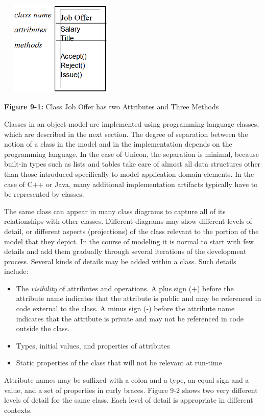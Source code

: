 \includegraphics[width=2.3in,height=1.8in]{ub-img/umlclass.png} 

{\sffamily\bfseries Figure 9-1:}
{\sffamily Class Job Offer has two Attributes and Three Methods}

\bigskip

Classes in an object model are
implemented using programming language classes, which are described in
the next section. The degree of separation between the notion of a
class in the model and in the implementation depends on the programming
language. In the case of Unicon, the separation is minimal, because
built-in types such as lists and tables take care of almost all data
structures other than those introduced specifically to model
application domain elements. In the case of C++ or Java,
many additional implementation artifacts typically have to be
represented by classes.

The same class can appear in many class diagrams to capture all of its
relationships with other classes. Different diagrams may show different
levels of detail, or different aspects (projections) of the class
relevant to the portion of the model that they depict. In the course of
modeling it is normal to start with few details and add them gradually
through several iterations of the development process. Several kinds of
details may be added within a class. Such details include:

\begin{itemize}
\item The \textit{visibility} of
attributes and operations. A plus sign (+) before the attribute name
indicates that the attribute is public and may be
referenced in code external to the class. A minus sign
(-) before the attribute name indicates that the attribute is
private and may not be referenced in code outside the
class.
\item Types, initial values, and properties of attributes
\item Static properties of the class that will not be relevant at
run-time
\end{itemize}
Attribute names may be suffixed with a colon and a type, an equal sign
and a value, and a set of properties in curly braces. Figure 9-2 shows
two very different levels of detail for the same class. Each level of
detail is appropriate in different contexts.

